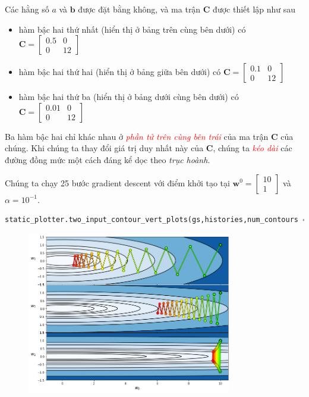 \documentclass{book}
\begin{document}
Các hằng số $a$ và $\mathbf{b}$ được đặt bằng không, và ma trận $\mathbf{C}$ được thiết lập như sau
\begin{itemize}
    \item hàm bậc hai thứ nhất (hiển thị ở bảng trên cùng bên dưới) có $\mathbf{C} = \begin{bmatrix} 0.5 & 0 \\ 0 & 12\end{bmatrix}$ 
    \item hàm bậc hai thứ hai (hiển thị ở bảng giữa bên dưới) có $\mathbf{C} = \begin{bmatrix} 0.1 & 0\\ 0 & 12\end{bmatrix}$ 
    \item hàm bậc hai thứ ba (hiển thị ở bảng dưới cùng bên dưới) có $\mathbf{C} = \begin{bmatrix} 0.01 & 0 \\ 0 & 12\end{bmatrix}$ 
\end{itemize}
Ba hàm bậc hai chỉ khác nhau ở \textit{\textcolor{red}{phần tử trên cùng bên trái}} của ma trận $\mathbf{C}$ của chúng. Khi chúng ta thay đổi giá trị duy nhất này của $\mathbf{C}$, chúng ta \textit{\textcolor{red}{kéo dài}} các đường đồng mức một cách đáng kể dọc theo \textit{trục hoành}.

Chúng ta chạy 25 bước gradient descent với điểm khởi tạo tại $\mathbf{w}^0 = \begin{bmatrix} 10 \\ 1 \end{bmatrix}$  và $\alpha = 10^{-1}$.

\begin{lstlisting}[language=python]
    static_plotter.two_input_contour_vert_plots(gs,histories,num_contours = 20,xmin = -1,xmax = 10.5,ymin = -1.5,ymax = 1.5)
\end{lstlisting}
\begin{figure}[H]
    \centering
    \includegraphics[width=0.8\textwidth]{images/zig-zag_behaviours.png}
\end{figure}
\end{document}
